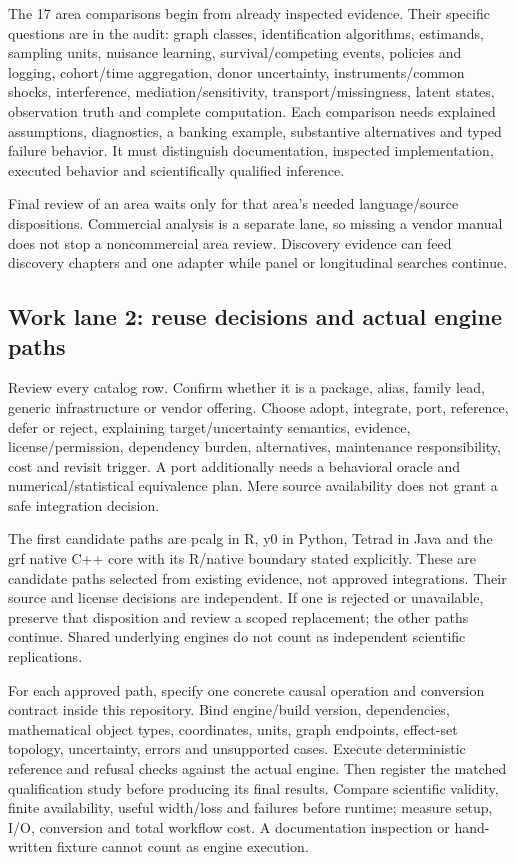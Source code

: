 \documentclass[
  10pt,
]{article}
\begin{document}
The 17 area comparisons begin from already inspected evidence. Their
specific questions are in the audit: graph classes, identification
algorithms, estimands, sampling units, nuisance learning,
survival/competing events, policies and logging, cohort/time
aggregation, donor uncertainty, instruments/common shocks, interference,
mediation/sensitivity, transport/missingness, latent states, observation
truth and complete computation. Each comparison needs explained
assumptions, diagnostics, a banking example, substantive alternatives
and typed failure behavior. It must distinguish documentation, inspected
implementation, executed behavior and scientifically qualified
inference.

Final review of an area waits only for that area's needed
language/source dispositions. Commercial analysis is a separate lane, so
missing a vendor manual does not stop a noncommercial area review.
Discovery evidence can feed discovery chapters and one adapter while
panel or longitudinal searches continue.

\hypertarget{work-lane-2-reuse-decisions-and-actual-engine-paths}{%
\subsection{Work lane 2: reuse decisions and actual engine
paths}\label{work-lane-2-reuse-decisions-and-actual-engine-paths}}

Review every catalog row. Confirm whether it is a package, alias, family
lead, generic infrastructure or vendor offering. Choose adopt,
integrate, port, reference, defer or reject, explaining
target/uncertainty semantics, evidence, license/permission, dependency
burden, alternatives, maintenance responsibility, cost and revisit
trigger. A port additionally needs a behavioral oracle and
numerical/statistical equivalence plan. Mere source availability does
not grant a safe integration decision.

The first candidate paths are pcalg in R, y0 in Python, Tetrad in Java
and the grf native C++ core with its R/native boundary stated
explicitly. These are candidate paths selected from existing evidence,
not approved integrations. Their source and license decisions are
independent. If one is rejected or unavailable, preserve that
disposition and review a scoped replacement; the other paths continue.
Shared underlying engines do not count as independent scientific
replications.

For each approved path, specify one concrete causal operation and
conversion contract inside this repository. Bind engine/build version,
dependencies, mathematical object types, coordinates, units, graph
endpoints, effect-set topology, uncertainty, errors and unsupported
cases. Execute deterministic reference and refusal checks against the
actual engine. Then register the matched qualification study before
producing its final results. Compare scientific validity, finite
availability, useful width/loss and failures before runtime; measure
setup, I/O, conversion and total workflow cost. A documentation
inspection or hand-written fixture cannot count as engine execution.
\end{document}
